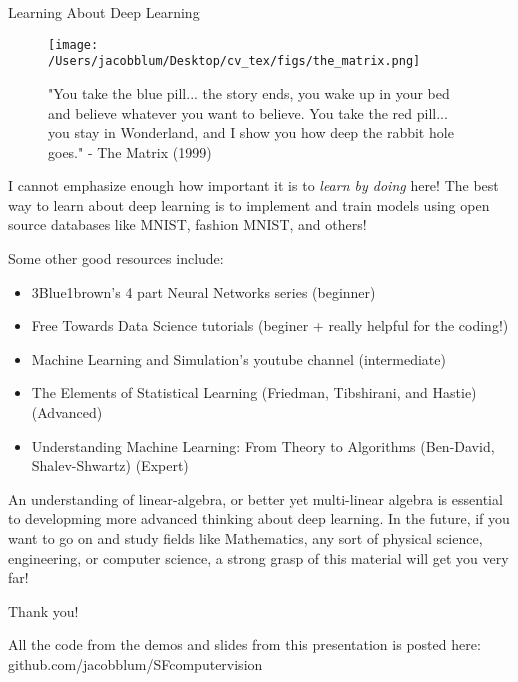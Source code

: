 \documentclass{beamer}
\begin{document}
\begin{frame}[plain]{Learning About Deep Learning}
    \begin{figure}
        \centering
        \texttt{[image: /Users/jacobblum/Desktop/cv\_tex/figs/the\_matrix.png]}
        \caption{"You take the blue pill... the story ends, you wake up in your bed and believe whatever you want to believe. 
        You take the red pill... you stay in Wonderland, and I show you how deep the rabbit hole goes." - The Matrix (1999)}
    \end{figure}
\end{frame}


\begin{frame}
    \small{I cannot emphasize enough how important it is to \textit{learn by doing} here! The best way to learn about deep learning is to implement and train models using 
    open source databases like MNIST, fashion MNIST, and others!}

    Some other good resources include:
    \begin{itemize}
        \item 3Blue1brown's 4 part Neural Networks series (beginner)
        \item Free Towards Data Science tutorials (beginer + really helpful for the coding!) 
        \item Machine Learning and Simulation's youtube channel (intermediate)
        \item The Elements of Statistical Learning (Friedman, Tibshirani, and Hastie) (Advanced)
        \item Understanding Machine Learning: From Theory to Algorithms (Ben-David, Shalev-Shwartz) (Expert)
    \end{itemize}    

    \small{An understanding of linear-algebra, or better yet multi-linear algebra is essential to developming more advanced thinking about deep learning. In the future, 
    if you want to go on and study fields like Mathematics, any sort of physical science, engineering, or computer science, a strong grasp of this material will get you very far!}
    \end{frame}


\begin{frame}[plain]{Thank you!}

All the code from the demos and slides from this presentation is posted here: github.com/jacobblum/SFcomputervision


\end{frame}
\end{document}
